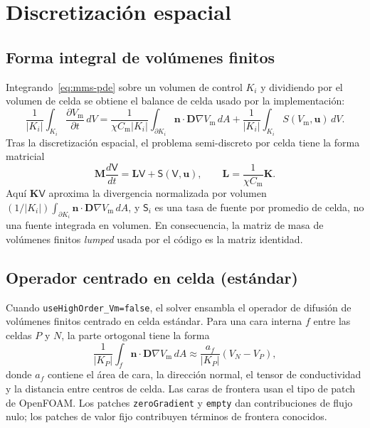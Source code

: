 \documentclass[11pt,a4paper]{article}
\newcommand{\code}[1]{\texttt{\small #1}}
\newcommand{\Vm}{V_{\text{m}}}
\newcommand{\Dten}{\mathbf{D}}
\newcommand{\grad}{\nabla}
\newcommand{\Mmass}{\mathbf{M}}
\newcommand{\Kstif}{\mathbf{K}}
\newcommand{\Lop}{\mathbf{L}}
\begin{document}
\section{Discretización espacial}

\subsection{Forma integral de volúmenes finitos}

Integrando~\eqref{eq:mms-pde} sobre un volumen de control $K_i$ y dividiendo por el volumen
de celda se obtiene el balance de celda usado por la implementación:
\begin{equation}
  \frac{1}{|K_i|}\int_{K_i}\frac{\partial \Vm}{\partial t}\,dV
  =
  \frac{1}{\chi C_{\text{m}}|K_i|}
  \int_{\partial K_i}\mathbf{n}\cdot\Dten\grad\Vm\,dA
  +
  \frac{1}{|K_i|}\int_{K_i}S(\Vm,\mathbf{u})\,dV.
  \label{eq:fv-integral}
\end{equation}
Tras la discretización espacial, el problema semi-discreto por celda tiene la
forma matricial
\begin{equation}
  \Mmass \frac{d\mathsf{V}}{dt}
  =
  \Lop \mathsf{V}
  +
  \mathsf{S}(\mathsf{V},\mathbf{u}),
  \qquad
  \Lop = \frac{1}{\chi C_{\text{m}}}\Kstif.
  \label{eq:semidiscrete}
\end{equation}
Aquí $\Kstif\mathsf{V}$ aproxima la divergencia normalizada por volumen
$(1/|K_i|)\int_{\partial K_i}\mathbf{n}\cdot\Dten\grad\Vm\,dA$, y $\mathsf{S}_i$ es una tasa
de fuente por promedio de celda, no una fuente integrada en volumen. En consecuencia, la
matriz de masa de volúmenes finitos \emph{lumped} usada por el código es la matriz identidad.

\subsection{Operador centrado en celda (estándar)}
\label{sec:std-operator}

Cuando \code{useHighOrder\_Vm=false}, el solver ensambla el operador de difusión de
volúmenes finitos centrado en celda estándar. Para una cara interna $f$ entre las celdas
$P$ y $N$, la parte ortogonal tiene la forma
\begin{equation}
  \frac{1}{|K_P|}\int_f \mathbf{n}\cdot\Dten\grad\Vm\,dA
  \approx
  \frac{a_f}{|K_P|}(V_N-V_P),
\end{equation}
donde $a_f$ contiene el área de cara, la dirección normal, el tensor de conductividad y la
distancia entre centros de celda. Las caras de frontera usan el tipo de patch de OpenFOAM.
Los patches \code{zeroGradient} y \code{empty} dan contribuciones de flujo nulo; los
patches de valor fijo contribuyen términos de frontera conocidos.
\end{document}
